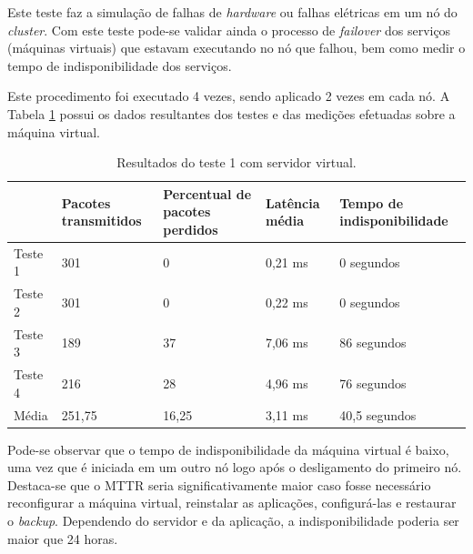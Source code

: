 Este teste faz a simulação de falhas de \textit{hardware} ou falhas elétricas em um nó do \textit{cluster}. Com este teste pode-se validar ainda 
o processo de \textit{failover} dos serviços (máquinas virtuais) que estavam executando no nó que falhou, bem como medir o tempo de 
indisponibilidade dos serviços.


Este procedimento foi executado 4 vezes, sendo aplicado 2 vezes em cada nó. A Tabela \ref{tab:teste1resultadosvirt} possui os dados 
resultantes dos testes e das medições efetuadas sobre a máquina virtual.

\begin{table}[h!]
\caption{Resultados do teste 1 com servidor virtual.}
\label{tab:teste1resultadosvirt}
\begin{center}
\begin{tabular}{|l|p{2.2cm}|p{2.5cm}|p{2cm}|p{2.7cm}|}\hline
 & \textbf{Pacotes transmitidos} & \textbf{Percentual de pacotes perdidos} & \textbf{Latência média} & \textbf{Tempo de indisponibilidade} \\\hline
Teste 1 & 301 & 0 & 0,21 ms & 0 segundos \\\hline
Teste 2 & 301 & 0 & 0,22 ms & 0 segundos \\\hline
Teste 3 & 189 & 37 & 7,06 ms & 86 segundos \\\hline
Teste 4 & 216 & 28 & 4,96 ms & 76 segundos \\\hline
Média & 251,75 & 16,25 & 3,11 ms & 40,5 segundos \\\hline
\end{tabular}
\end{center}
\end{table}

Pode-se observar que o tempo de indisponibilidade da máquina virtual é baixo, uma vez que é iniciada em um outro nó logo após o desligamento do 
primeiro nó. Destaca-se que o \ac{MTTR} seria significativamente maior caso fosse necessário reconfigurar a máquina virtual, reinstalar as 
aplicações, configurá-las e restaurar o \textit{backup}. Dependendo do servidor e da aplicação, a indisponibilidade poderia ser maior que 24 horas.

